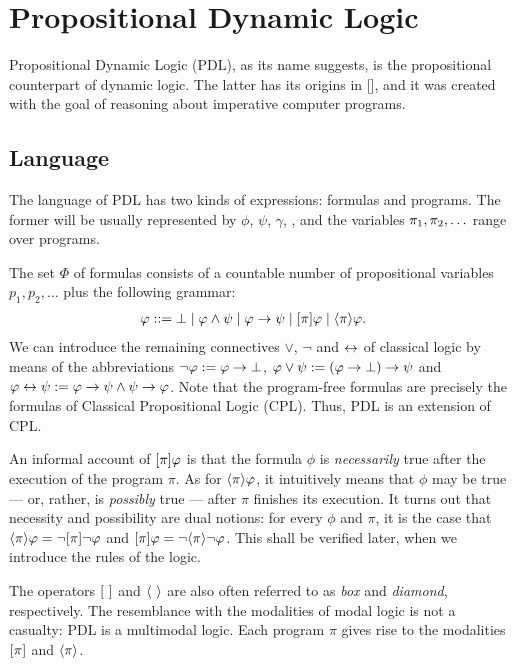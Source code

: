 \section{Propositional Dynamic Logic}
Propositional Dynamic Logic (PDL), as its name suggests, is the propositional counterpart of dynamic logic. The latter has its origins in 
[], and it was created with the goal of reasoning about imperative computer programs.

\subsection{Language}

The language of PDL has two kinds of expressions: formulas and programs. The former will be usually represented by $\phi$, $\psi$, $\gamma$, \etc, and the variables $\pi_1, \pi_2, \ldots$ range over programs.

\begin{definition}
The set $\Phi$ of formulas consists of a countable number of propositional variables $p_1, p_2,\dots$ plus the following grammar:
%
\begin{align*}
    \varphi & \mathrel{::=} \bot \mid \varphi \land \psi \mid \varphi \to \psi
    \mid [\pi] \varphi \mid \langle \pi \rangle \varphi.
\end{align*}
We can introduce the remaining  connectives $\lor$, $\lnot$ and $\leftrightarrow$ of classical logic by means of the abbreviations $\lnot \varphi \mathrel{:=} \varphi \to \bot$, $\varphi \lor \psi \mathrel{:=} (\varphi \to \bot)\to \psi$ and $\varphi \leftrightarrow \psi \mathrel{:=} \varphi \to \psi \land \psi \to \varphi$. Note that the program-free formulas are precisely the formulas of Classical Propositional Logic (CPL). Thus, PDL is an extension of CPL.
\end{definition}

An informal account of $[\pi] \varphi$ is that the formula $\phi$ is \emph{necessarily} true after the execution of the program $\pi$. As for $\langle \pi \rangle \varphi$, it intuitively means that $\phi$ may be true --- or, rather, is \emph{possibly} true --- after $\pi$ finishes its execution. 
It turns out that necessity and possibility are dual notions: for every $\phi$ and $\pi$, it is the case that $\langle \pi \rangle \varphi = \lnot [\pi] \lnot \varphi$ and $[\pi] \varphi = \lnot \langle \pi \rangle \lnot \varphi$. This shall be verified later, when we introduce the rules of the logic.

The operators $[\ ]$ and $\langle \  \rangle$ are also often referred to as \emph{box} and \emph{diamond}, respectively. The resemblance with the modalities of modal logic is not a casualty: PDL is a multimodal logic. Each program $\pi$ gives rise to the modalities $[\pi]$ and $\langle \pi \rangle$.

